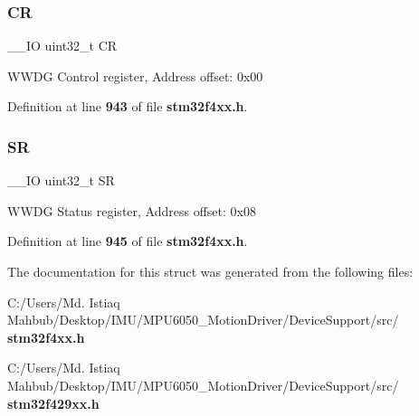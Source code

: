 \subsubsection{CR}
{\footnotesize\ttfamily \+\_\+\+\_\+\+IO uint32\+\_\+t CR}

W\+W\+DG Control register, Address offset\+: 0x00 

Definition at line \textbf{ 943} of file \textbf{ stm32f4xx.\+h}.

\mbox{\label{structWWDG__TypeDef_af6aca2bbd40c0fb6df7c3aebe224a360}} 
\subsubsection{SR}
{\footnotesize\ttfamily \+\_\+\+\_\+\+IO uint32\+\_\+t SR}

W\+W\+DG Status register, Address offset\+: 0x08 

Definition at line \textbf{ 945} of file \textbf{ stm32f4xx.\+h}.



The documentation for this struct was generated from the following files\+:\begin{DoxyCompactItemize}
\item 
C\+:/\+Users/\+Md. Istiaq Mahbub/\+Desktop/\+I\+M\+U/\+M\+P\+U6050\+\_\+\+Motion\+Driver/\+Device\+Support/src/\textbf{ stm32f4xx.\+h}\item 
C\+:/\+Users/\+Md. Istiaq Mahbub/\+Desktop/\+I\+M\+U/\+M\+P\+U6050\+\_\+\+Motion\+Driver/\+Device\+Support/src/\textbf{ stm32f429xx.\+h}\end{DoxyCompactItemize}

